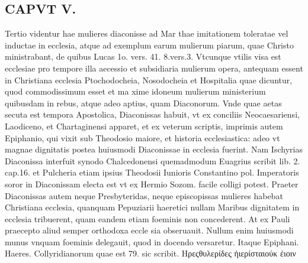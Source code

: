 \documentclass{article}
\begin{document}
\begin{pages}
\section*{CAPVT  V. }
\marginpar{[ p.273 ]}\pstart Tertio videntur hae mulieres diaconisse ad Mar thae imitationem toleratae vel inductae in ecclesia, atque ad exemplum earum mulierum piarum, quae Christo ministrabant, de quibus Lucas 1o. vers. 41. 8.vers.3. Vtcunque vtilis visa est ecclesiae pro tempore illa aecessio et subsidiaria mulierum opera, antequam essent in Christiana ecclesia Ptochodocheia, Nosodocheia et Hospitalia quae dicuntur, quod commodissimum esset et ma xime idoneum mulierum ministerium quibusdam in rebus, atque adeo aptius, quam Diaconorum. Vnde quae aetas secuta est tempora Apostolica, Diaconissas habuit, vt ex conciliis Neocaesariensi, Laodiceno, et Chartaginensi apparet, et ex veterum scriptis, imprimis autem Epiphanio, qui vixit sub Theodosio maiore, et historia ecclesiastica: adeo vt magnae dignitatis postea huiusmodi Diaconissae in ecclesia fuerint. Nam Ischyrias Diaconissa interfuit synodo Chalcedonensi quemadmodum Euagrius scribit lib. 2. cap.16. et Pulcheria etiam ipsius Theodosii Iunioris Constantino pol. Imperatoris soror in Diaconissam electa est vt ex Hermio Sozom. facile colligi potest. Praeter Diaconissas autem neque Presbyteridas, neque episcopissas mulieres habebat Christiana ecclesia, quanquam Pepuziarii haeretici nullam Maribus dignitatem in ecclesia tribuerent, quam eandem etiam foeminis non concederent. At ex Pauli praecepto aliud semper orthodoxa eccle sia obseruauit. Nullum enim huiusmodi munus vnquam foeminis delegauit, quod in docendo versaretur. Itaque Epiphani. Haeres. Collyridianorum quae est 79. sic scribit. Hρεςθυλερίδες ἠιερίσταιούκ ἐιοιν  \pend

\end{pages}
\end{document}

